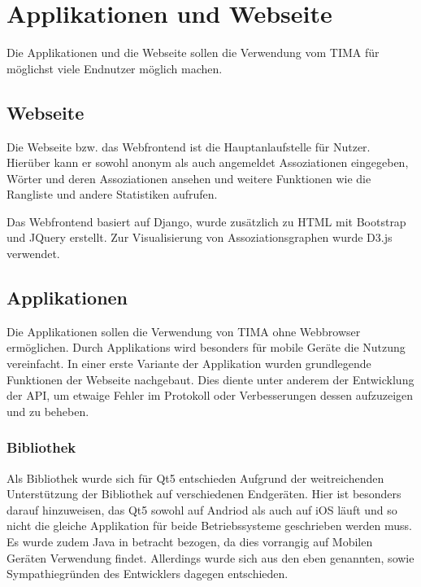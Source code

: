 \chapter{Applikationen und Webseite}
Die Applikationen und die Webseite sollen die Verwendung vom TIMA für möglichst
viele Endnutzer möglich machen.

\section{Webseite}
Die Webseite bzw. das Webfrontend ist die Hauptanlaufstelle für Nutzer. Hierüber kann er sowohl anonym als auch angemeldet Assoziationen eingegeben, Wörter und
deren Assoziationen ansehen und weitere Funktionen wie die Rangliste und andere Statistiken aufrufen.

Das Webfrontend basiert auf Django, wurde zusätzlich zu HTML mit Bootstrap und JQuery erstellt. Zur Visualisierung von Assoziationsgraphen wurde D3.js verwendet.

\section{Applikationen}
Die Applikationen sollen die Verwendung von TIMA ohne Webbrowser ermöglichen. Durch Applikations wird besonders für mobile Geräte die Nutzung vereinfacht.
In einer erste Variante der Applikation wurden grundlegende Funktionen der
Webseite nachgebaut. Dies diente unter anderem der Entwicklung der API, um etwaige
Fehler im Protokoll oder Verbesserungen dessen aufzuzeigen und zu beheben.

\subsection{Bibliothek}
Als Bibliothek wurde sich für Qt5 entschieden Aufgrund der weitreichenden
Unterstützung der Bibliothek auf verschiedenen Endgeräten. Hier ist besonders darauf hinzuweisen, das Qt5 sowohl auf Andriod als auch auf iOS läuft und so nicht die gleiche Applikation für beide Betriebssysteme geschrieben werden muss.
Es wurde zudem Java in betracht bezogen, da dies vorrangig auf Mobilen Geräten
Verwendung findet. Allerdings wurde sich aus den eben genannten, sowie Sympathiegründen des Entwicklers
dagegen entschieden.

